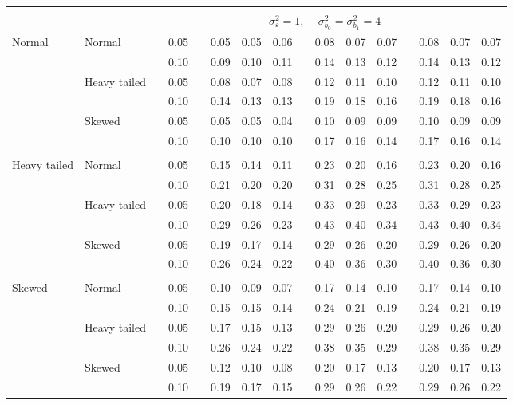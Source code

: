 \documentclass[11pt]{article} %
\begin{document}
\begin{table}[ht]
\begin{scriptsize}
\begin{center}
\begin{tabular}{ll p{.1cm} c p{.1cm} rrr p{.1cm} rrr p{.1cm} rrr}
&&&&&&&&&&&&&&&\\
& && && \multicolumn{9}{c}{$\sigma_{\varepsilon}^2 = 1$, \ \ $\sigma_{b_0}^2 = \sigma_{b_1}^2 = 4$} \\ \cline{6-16}
Normal       & Normal       && 0.05 &&  0.05 & 0.05 & 0.06 && 0.08 & 0.07 & 0.07 && 0.08 & 0.07 & 0.07 \\ 
             &              && 0.10 &&  0.09 & 0.10 & 0.11 && 0.14 & 0.13 & 0.12 && 0.14 & 0.13 & 0.12 \\ 
             & Heavy tailed && 0.05 &&  0.08 & 0.07 & 0.08 && 0.12 & 0.11 & 0.10 && 0.12 & 0.11 & 0.10 \\ 
             &              && 0.10 &&  0.14 & 0.13 & 0.13 && 0.19 & 0.18 & 0.16 && 0.19 & 0.18 & 0.16 \\ 
             & Skewed       && 0.05 &&  0.05 & 0.05 & 0.04 && 0.10 & 0.09 & 0.09 && 0.10 & 0.09 & 0.09 \\ 
             &              && 0.10 &&  0.10 & 0.10 & 0.10 && 0.17 & 0.16 & 0.14 && 0.17 & 0.16 & 0.14 \\
             &&&&&&&&&&&&&&&\\ 
Heavy tailed & Normal       && 0.05 &&  0.15 & 0.14 & 0.11 && 0.23 & 0.20 & 0.16 && 0.23 & 0.20 & 0.16 \\ 
             &              && 0.10 &&  0.21 & 0.20 & 0.20 && 0.31 & 0.28 & 0.25 && 0.31 & 0.28 & 0.25 \\ 
             & Heavy tailed && 0.05 &&  0.20 & 0.18 & 0.14 && 0.33 & 0.29 & 0.23 && 0.33 & 0.29 & 0.23 \\ 
             &              && 0.10 &&  0.29 & 0.26 & 0.23 && 0.43 & 0.40 & 0.34 && 0.43 & 0.40 & 0.34 \\ 
             & Skewed       && 0.05 &&  0.19 & 0.17 & 0.14 && 0.29 & 0.26 & 0.20 && 0.29 & 0.26 & 0.20 \\ 
             &              && 0.10 &&  0.26 & 0.24 & 0.22 && 0.40 & 0.36 & 0.30 && 0.40 & 0.36 & 0.30 \\ 
             &&&&&&&&&&&&&&&\\
Skewed       & Normal       && 0.05 &&  0.10 & 0.09 & 0.07 && 0.17 & 0.14 & 0.10 && 0.17 & 0.14 & 0.10 \\ 
             &              && 0.10 &&  0.15 & 0.15 & 0.14 && 0.24 & 0.21 & 0.19 && 0.24 & 0.21 & 0.19 \\ 
             & Heavy tailed && 0.05 &&  0.17 & 0.15 & 0.13 && 0.29 & 0.26 & 0.20 && 0.29 & 0.26 & 0.20 \\ 
             &              && 0.10 &&  0.26 & 0.24 & 0.22 && 0.38 & 0.35 & 0.29 && 0.38 & 0.35 & 0.29 \\ 
             & Skewed       && 0.05 &&  0.12 & 0.10 & 0.08 && 0.20 & 0.17 & 0.13 && 0.20 & 0.17 & 0.13 \\ 
             &              && 0.10 &&  0.19 & 0.17 & 0.15 && 0.29 & 0.26 & 0.22 && 0.29 & 0.26 & 0.22 \\ 


\end{tabular}
\end{center}
\end{scriptsize}
\end{table}
\end{document}
